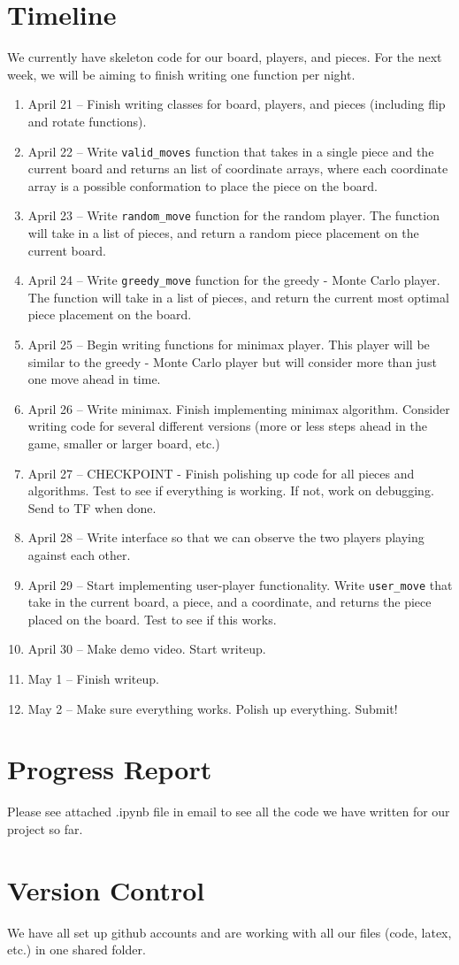 \documentclass[11pt]{article}
\begin{document}
\bigskip


\section{Timeline}

We currently have skeleton code for our board, players, and pieces. For the next week, we will be aiming to finish writing one function per night.

\begin{enumerate}
	\item April 21 -- Finish writing classes for board, players, and pieces (including flip and rotate functions). 
	\item April 22 -- Write \texttt{valid\_moves} function that takes in a single piece and the current board and returns an list of coordinate arrays, where each coordinate array is a possible conformation to place the piece on the board. 
	\item April 23 -- Write \texttt{random\_move} function for the random player. The function will take in a list of pieces, and return a random piece placement on the current board. 
	\item April 24 -- Write \texttt{greedy\_move} function for the greedy - Monte Carlo player. The function will take in a list of pieces, and return the current most optimal piece placement on the board. 
	\item April 25 -- Begin writing functions for minimax player. This player will be similar to the greedy - Monte Carlo player but will consider more than just one move ahead in time.
	\item April 26 -- Write minimax. Finish implementing minimax algorithm. Consider writing code for several different versions (more or less steps ahead in the game, smaller or larger board, etc.)
	\item April 27 -- CHECKPOINT - Finish polishing up code for all pieces and algorithms. Test to see if everything is working. If not, work on debugging. Send to TF when done.
	\item April 28 -- Write interface so that we can observe the two players playing against each other.  
	\item April 29 -- Start implementing user-player functionality. Write \texttt{user\_move} that take in the current board, a piece, and a coordinate, and returns the piece placed on the board. Test to see if this works. 
	\item April 30 -- Make demo video. Start writeup.
	\item May 1 -- Finish writeup. 
	\item May 2 -- Make sure everything works. Polish up everything. Submit! 
\end{enumerate}
\section{Progress Report}
Please see attached .ipynb file in email to see all the code we have written for our project so far.
\section{Version Control}
We have all set up github accounts and are working with all our files (code, latex, etc.) in one shared folder.
\end{document}
